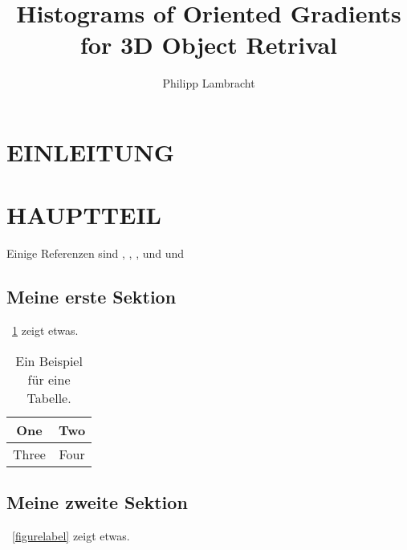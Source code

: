 \documentclass[a4paper, 10pt, conference]{ieeeconf_de}
\title{\LARGE \bf
	Histograms of Oriented Gradients for 3D Object Retrival
}
\author{Philipp Lambracht}
\begin{document}
\maketitle
\thispagestyle{empty}
\pagestyle{empty}



\begin{abstract}

	

\end{abstract}


\section{EINLEITUNG}

	

\section{HAUPTTEIL}

Einige Referenzen sind \cite{Hartley03}, \cite{Arulampalam02}, \cite{scherer2010histograms} , \cite{dalal2005histograms} und \cite{Kaestner05} und \cite{Priese15}

\subsection{Meine erste Sektion} 
\tablename~\ref{table_example} zeigt etwas.

\begin{table}
\caption{Ein Beispiel für eine Tabelle.}
\label{table_example}
\begin{center}
\begin{tabular}{|c||c|}
\hline
One & Two\\
\hline
Three & Four\\
\hline
\end{tabular}
\end{center}
\end{table}


\subsection{Meine zweite Sektion}

\figurename~\ref{figurelabel} zeigt etwas.
\end{document}
